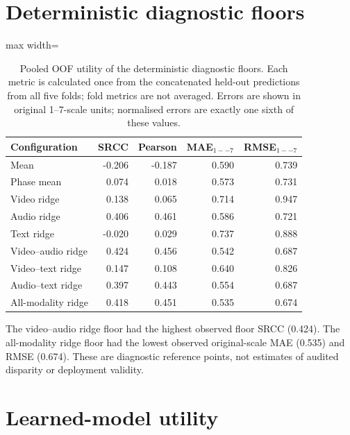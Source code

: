 \section{Deterministic diagnostic floors}

\begin{table}[htbp]
\centering
\caption{Pooled OOF utility of the deterministic diagnostic floors. Each metric is calculated once
from the concatenated held-out predictions from all five folds; fold metrics are not averaged.
Errors are shown in original 1--7-scale units; normalised errors are exactly one sixth of these
values.}
\label{tab:stage-a-floors}
\small
\begin{adjustbox}{max width=\textwidth}
\begin{tabular}{lrrrr}
\toprule
Configuration & SRCC & Pearson & MAE$_{1--7}$ & RMSE$_{1--7}$ \\
\midrule
Mean & -0.206 & -0.187 & 0.590 & 0.739 \\
Phase mean & 0.074 & 0.018 & 0.573 & 0.731 \\
Video ridge & 0.138 & 0.065 & 0.714 & 0.947 \\
Audio ridge & 0.406 & 0.461 & 0.586 & 0.721 \\
Text ridge & -0.020 & 0.029 & 0.737 & 0.888 \\
Video--audio ridge & 0.424 & 0.456 & 0.542 & 0.687 \\
Video--text ridge & 0.147 & 0.108 & 0.640 & 0.826 \\
Audio--text ridge & 0.397 & 0.443 & 0.554 & 0.687 \\
All-modality ridge & 0.418 & 0.451 & 0.535 & 0.674 \\
\bottomrule
\end{tabular}
\end{adjustbox}
\end{table}
\FloatBarrier

The video--audio ridge floor had the highest observed floor SRCC (0.424). The all-modality ridge
floor had the lowest observed original-scale MAE (0.535) and RMSE (0.674). These are
diagnostic reference points, not estimates of audited disparity or deployment validity.

\section{Learned-model utility}

